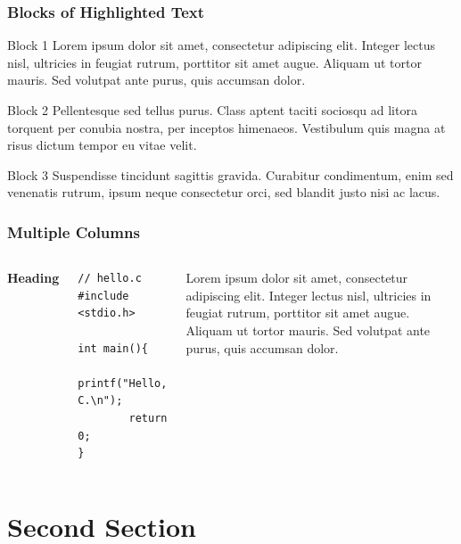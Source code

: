 \documentclass{beamer}
\begin{document}
\begin{frame}
\frametitle{Blocks of Highlighted Text}
\begin{block}{Block 1}
Lorem ipsum dolor sit amet, consectetur adipiscing elit. Integer lectus nisl, ultricies in feugiat rutrum, porttitor sit amet augue. Aliquam ut tortor mauris. Sed volutpat ante purus, quis accumsan dolor.
\end{block}

\begin{block}{Block 2}
Pellentesque sed tellus purus. Class aptent taciti sociosqu ad litora torquent per conubia nostra, per inceptos himenaeos. Vestibulum quis magna at risus dictum tempor eu vitae velit.
\end{block}

\begin{block}{Block 3}
Suspendisse tincidunt sagittis gravida. Curabitur condimentum, enim sed venenatis rutrum, ipsum neque consectetur orci, sed blandit justo nisi ac lacus.
\end{block}
\end{frame}


\begin{frame}[fragile]
\frametitle{Multiple Columns}
\begin{columns}[c] %

\textbf{Heading}
\begin{example}[hello.c]
\begin{verbatim}
// hello.c
#include <stdio.h>

int main(){
        printf("Hello, C.\n");
        return 0;
}
\end{verbatim}
\end{example}
Lorem ipsum dolor sit amet, consectetur adipiscing elit. Integer lectus nisl, ultricies in feugiat rutrum, porttitor sit amet augue. Aliquam ut tortor mauris. Sed volutpat ante purus, quis accumsan dolor.

\end{columns}
\end{frame}

\section{Second Section}
\end{document}
